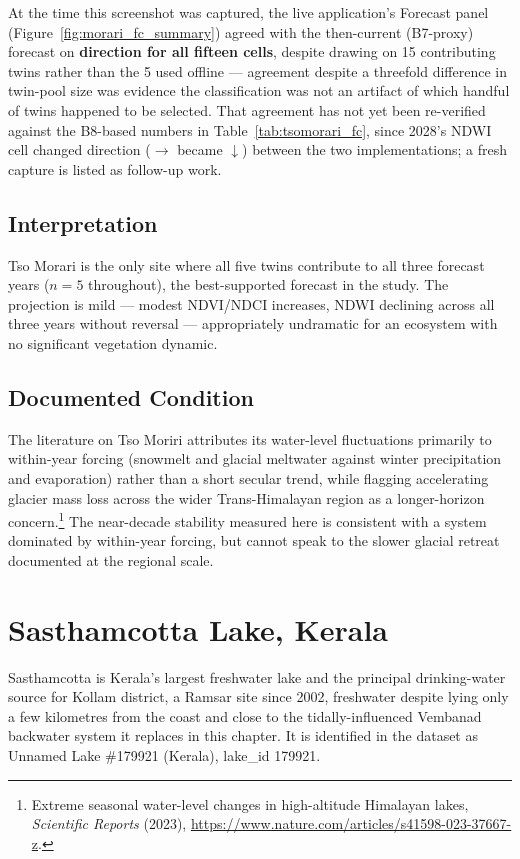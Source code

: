 \documentclass[12pt,a4paper,oneside]{report}
\begin{document}
At the time this screenshot was captured, the live application's
Forecast panel (Figure~\ref{fig:morari_fc_summary}) agreed with the
then-current (B7-proxy) forecast on \textbf{direction for all fifteen
cells}, despite drawing on 15 contributing twins rather than the 5
used offline --- agreement despite a threefold difference in
twin-pool size was evidence the classification was not an artifact
of which handful of twins happened to be selected. That agreement
has not yet been re-verified against the B8-based numbers in
Table~\ref{tab:tsomorari_fc}, since 2028's NDWI cell changed
direction ($\rightarrow$ became $\downarrow$) between the two
implementations; a fresh capture is listed as follow-up work.

\subsection{Interpretation}

Tso Morari is the only site where all five twins contribute to all
three forecast years ($n=5$ throughout), the best-supported forecast
in the study. The projection is mild --- modest NDVI/NDCI increases,
NDWI declining across all three years without reversal ---
appropriately undramatic for an ecosystem with no significant
vegetation dynamic.

\subsection{Documented Condition}

The literature on Tso Moriri attributes its water-level fluctuations
primarily to within-year forcing (snowmelt and glacial meltwater
against winter precipitation and evaporation) rather than a short
secular trend, while flagging accelerating glacier mass loss across
the wider Trans-Himalayan region as a longer-horizon
concern.\footnote{Extreme seasonal water-level changes in
high-altitude Himalayan lakes, \emph{Scientific Reports} (2023),
\url{https://www.nature.com/articles/s41598-023-37667-z}.} The
near-decade stability measured here is consistent with a system
dominated by within-year forcing, but cannot speak to the slower
glacial retreat documented at the regional scale.

\section{Sasthamcotta Lake, Kerala}

Sasthamcotta is Kerala's largest freshwater lake and the principal
drinking-water source for Kollam district, a Ramsar site since 2002,
freshwater despite lying only a few kilometres from the coast and
close to the tidally-influenced Vembanad backwater system it
replaces in this chapter. It is identified in the dataset as
Unnamed Lake \#179921 (Kerala), lake\_id 179921.
\end{document}
